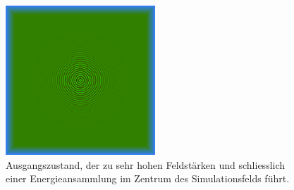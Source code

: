 \begin{figure}
    \begin{center}
        \includegraphics[width=0.5\textwidth]{papers/particles/figures/wavesim/particle_initial_state.png}
        \caption{Ausgangszustand, der zu sehr hohen Feldstärken und schliesslich einer Energieansammlung im Zentrum des Simulationsfelds führt.}\label{particles:fig:partikel:ausgangszustand}
    \end{center}
\end{figure}